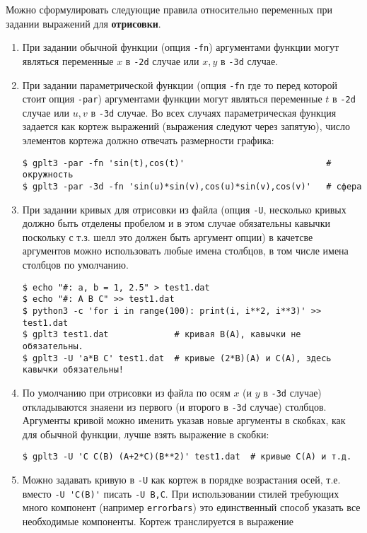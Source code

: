 \documentclass[12pt]{article}
\begin{document}
Можно сформулировать следующие правила относительно переменных при задании выражений для {\bf отрисовки}.
\begin{enumerate}
\item При задании обычной функции (опция \verb'-fn') аргументами функции могут являться переменные $x$ в \verb'-2d' случае или  $x, y$ в \verb'-3d' случае.
\item При задании параметрической функции (опция \verb'-fn' где то перед которой стоит опция \verb'-par')
  аргументами функции могут являться переменные $t$ в \verb'-2d' случае или  $u, v$ в \verb'-3d' случае. Во всех случаях параметрическая функция задается как
  кортеж выражений (выражения следуют через запятую), число элементов кортежа должно отвечать размерности графика:
\begin{verbatim}
$ gplt3 -par -fn 'sin(t),cos(t)'                            # окружность
$ gplt3 -par -3d -fn 'sin(u)*sin(v),cos(u)*sin(v),cos(v)'   # сфера
\end{verbatim}
\item При задании кривых для отрисовки из файла (опция \verb'-U', несколько кривых должно быть отделены пробелом и в этом случае обязательны кавычки поскольку с т.з.
  шелл это должен быть аргумент опции) в качетсве аргументов можно использовать любые имена столбцов, в том числе имена столбцов по умолчанию.
\begin{verbatim}
$ echo "#: a, b = 1, 2.5" > test1.dat 
$ echo "#: A B C" >> test1.dat 
$ python3 -c 'for i in range(100): print(i, i**2, i**3)' >> test1.dat
$ gplt3 test1.dat             # кривая B(A), кавычки не обязательны.
$ gplt3 -U 'a*B C' test1.dat  # кривые (2*B)(A) и C(A), здесь кавычки обязательны!
\end{verbatim}
\item По умолчанию при отрисовки из файла по осям $x$ (и $y$ в \verb'-3d' случае) откладываются знаяени из первого (и второго в \verb'-3d' случае) столбцов.
  Аргументы кривой можно именить указав новые аргументы в скобках, как для обычной функции, лучше взять выражение в скобки:
\begin{verbatim}
$ gplt3 -U 'С C(B) (A+2*C)(B**2)' test1.dat  # кривые C(A) и т.д.
\end{verbatim}
\item Можно задавать кривую в \verb'-U' как кортеж в порядке возрастания осей, т.е. вместо \verb|-U 'C(B)'| писать \verb'-U B,C'. При использовании
  стилей требующих много компонент (например \verb'errorbars') это единственный способ указать все необходимые компоненты. Кортеж транслируется в выражение

\end{enumerate}
\end{document}
